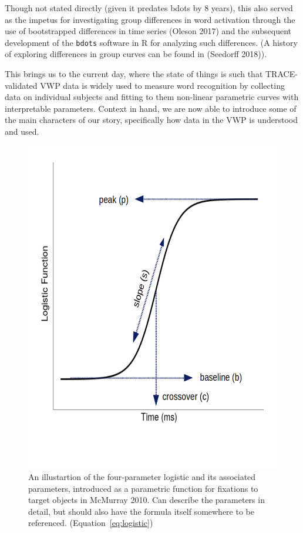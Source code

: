 \documentclass{article}
\newcommand{\xt}{\texttt}%
\begin{document}
Though not stated directly (given it predates bdots by 8 years), this also served as the impetus for investigating group differences in word activation through the use of bootstrapped differences in time series (Oleson 2017) and the subsequent development of the \xt{bdots} software in R for analyzing such differences. (A history of exploring differences in group curves can be found in (Seedorff 2018)).

This brings us to the current day, where the state of things is such that TRACE-validated VWP data is widely used to measure word recognition by collecting data on individual subjects and fitting to them non-linear parametric curves with interpretable parameters. Context in hand, we are now able to introduce some of the main characters of our story, specifically how data in the VWP is understood and used. 



\begin{figure}[h]
\centering
\includegraphics[scale=0.4]{logistic_label.png}
\caption{An illustartion of the four-parameter logistic and its associated parameters, introduced as a parametric function for fixations to target objects in McMurray 2010. Can describe the parameters in detail, but should also have the formula itself somewhere to be referenced. (Equation~\ref{eq:logistic})}
\label{fig:logistic_definition}
\end{figure}
\end{document}
